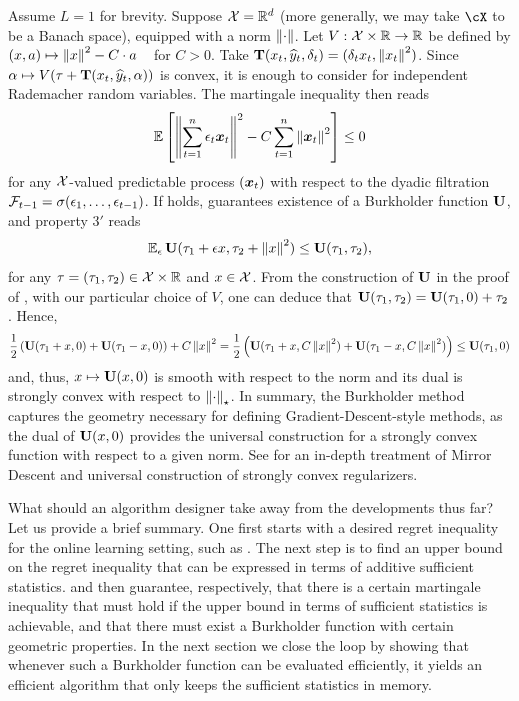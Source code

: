 \begin{example} 
	\label{ex:smoothness}
	Assume $L=1$ for brevity. Suppose $\X=\reals^d$ (more generally, we may take $\cX$ to be a Banach space), equipped with a norm $\norm{\cdot}$. Let $V:\X\times \reals\to\reals$ be defined by $(x,a) \mapsto \norm{x}^2-C \cdot a$ ~ for $C>0$. Take $\suff(x_t,\pred_t,\delta_t)=(\delta_t x_t, \norm{x_t}^2)$. Since $\alpha\mapsto V(\tau+\suff(x_t,\pred_t,\alpha))$ is convex, it is enough to consider  for independent Rademacher random variables. The martingale inequality  then reads
\begin{align}
	\label{eq:smoothness_martingale_ineq}
	\En\left[ \norm{\sum_{t=1}^n \epsilon_t\bx_t}^2 - C\sum_{t=1}^n \norm{\bx_t}^2\right] \leq 0
\end{align}
for any $\X$-valued predictable process $(\bx_t)$ with respect to the dyadic filtration $\F_{t-1} = \sigma(\epsilon_1,\ldots,\epsilon_{t-1})$. If  holds,  guarantees existence of a Burkholder function $\burk$, and property $3'$ reads 
$$\En_\epsilon \burk(\tau_1 + \epsilon x, \tau_2 + \norm{x}^2)  \le \burk(\tau_1,\tau_2),$$
for any $\tau=(\tau_1,\tau_2)\in\X\times \reals$ and $x\in\X$. From the construction of $\burk$ in the proof of , with our particular choice of $V$, one can deduce that $\burk(\tau_1,\tau_2)= \burk(\tau_1,0)+\tau_2$. Hence,
$$\frac{1}{2}\left( \burk(\tau_1 + x, 0)+ \burk(\tau_1-x, 0) \right) + C\norm{x}^2 = \frac{1}{2}\left( \burk(\tau_1 + x, C\norm{x}^2)+ \burk(\tau_1-x, C\norm{x}^2) \right) \leq \burk(\tau_1,0)$$
and, thus, $x\mapsto \burk(x,0)$ is smooth with respect to the norm and its dual is strongly convex with respect to $\nrm*{\cdot}_{\star}$. In summary, the Burkholder method captures the geometry necessary for defining Gradient-Descent-style methods, as the dual of $\burk(x,0)$ provides the universal construction for a strongly convex function with respect to a given norm. See \cite{srebro2011universality} for an in-depth treatment of Mirror Descent and universal construction of strongly convex regularizers.
\end{example}

What should an algorithm designer take away from the developments thus far? Let us provide a brief summary. One first starts with a desired regret inequality for the online learning setting, such as . The next step is to find an upper bound on the regret inequality that can be expressed in terms of additive sufficient statistics.  and  then guarantee, respectively, that there is a certain martingale inequality that must hold if the upper bound in terms of sufficient statistics is achievable, and that there must exist a Burkholder function with certain geometric properties. In the next section we close the loop by showing that whenever such a Burkholder function can be evaluated efficiently, it yields an efficient algorithm that only keeps the sufficient statistics in memory.

